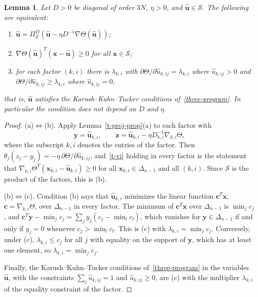 \documentclass[11pt]{article}
\theoremstyle{plain}
\newtheorem{lemma}[theorem]{Lemma}
\theoremstyle{definition}
\theoremstyle{remark}
\renewcommand{\labelenumi}{\textbf{\arabic{enumi}.}}
\numberwithin{equation}{section}
\numberwithin{figure}{section}
\numberwithin{table}{section}
\begin{document}
\begin{lemma}\label{t-fixed}
Let $D>0$ be diagonal of order $3N$, $\eta>0$, and
$\widehat{\bm u}\in\mathcal{S}$. The following are equivalent:
\begin{enumerate}
\renewcommand{\labelenumi}{(\alph{enumi})}
\item $\widehat{\bm u}=\Pi^D_{\mathcal{S}}\left(\widehat{\bm u}-\eta D^{-1}\nabla\Theta\left(\widehat{\bm u}\right)\right)$;
\item $\nabla\Theta\left(\widehat{\bm u}\right)^T\left(\bm x-\widehat{\bm u}\right)\ge 0$ for all $\bm x\in\mathcal{S}$;
\item for each factor $(k,i)$ there is $\lambda_{k,i}$ with
$\partial\Theta/\partial\widehat u_{k,ij}=\lambda_{k,i}$ where $\widehat u_{k,ij}>0$
and $\partial\Theta/\partial\widehat u_{k,ij}\ge\lambda_{k,i}$ where $\widehat u_{k,ij}=0$,
\end{enumerate}
that is, $\widehat{\bm u}$ satisfies the Karush--Kuhn--Tucker conditions
of~\eqref{three-program}. In particular the condition does not depend on $D$
and $\eta$.
\end{lemma}
\begin{proof}
(a)$\Leftrightarrow$(b). Apply Lemma~\ref{t-proj-prop}(a) to each factor
with
\begin{equation*}
\bm y=\widehat{\bm u}_{k,i},\qquad
\bm z=\widehat{\bm u}_{k,i}-\eta D_{k,i}^{-1}\nabla_{k,i}\Theta,
\end{equation*}
where the subscript $k,i$ denotes the entries of the factor. Then
$\theta_j(z_j-y_j)=-\eta\,\partial\Theta/\partial\widehat u_{k,ij}$,
and~\eqref{t-vi} holding in every factor is the statement that
$\nabla_{k,i}\Theta^T(\bm x_{k,i}-\widehat{\bm u}_{k,i})\ge 0$ for all
$\bm x_{k,i}\in\Delta_{n-1}$ and all $(k,i)$. Since $\mathcal{S}$ is the
product of the factors, this is (b).

(b)$\Leftrightarrow$(c). Condition (b) says that $\widehat{\bm u}_{k,i}$
minimizes the linear function $\bm c^T\bm x$, $\bm c=\nabla_{k,i}\Theta$, over
$\Delta_{n-1}$ in every factor. The minimum of $\bm c^T\bm x$ over
$\Delta_{n-1}$ is $\min_jc_j$, and
$\bm c^T\bm y-\min_jc_j=\sum_jy_j\left(c_j-\min_lc_l\right)$, which vanishes for
$\bm y\in\Delta_{n-1}$ if and only if $y_j=0$ whenever $c_j>\min_lc_l$. This
is (c) with $\lambda_{k,i}=\min_jc_j$. Conversely, under (c),
$\lambda_{k,i}\le c_j$ for all $j$ with equality on the support of $\bm y$,
which has at least one element, so $\lambda_{k,i}=\min_jc_j$.

Finally, the Karush--Kuhn--Tucker conditions of~\eqref{three-program} in the
variables $\widehat{\bm u}$, with the constraints $\sum_j\widehat u_{k,ij}=1$
and $\widehat u_{k,ij}\ge 0$, are (c) with the multiplier $\lambda_{k,i}$ of
the equality constraint of the factor.
\end{proof}
\end{document}

